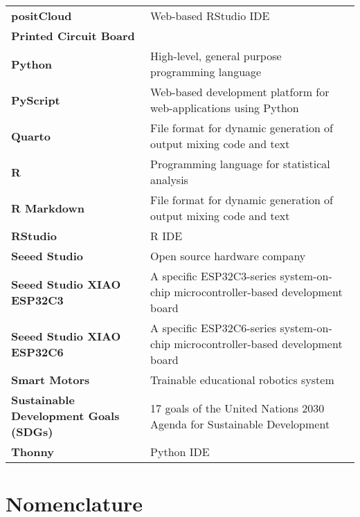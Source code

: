 {\begin{longtable}{>{\raggedright \bfseries}p{} p{}}
positCloud          & Web-based RStudio IDE \\
Printed Circuit Board&  \\
Python              & High-level, general purpose programming language \\
PyScript            & Web-based development platform for web-applications using Python \\
Quarto              & File format for dynamic generation of output mixing code and text \\
R                   & Programming language for statistical analysis \\
R Markdown          & File format for dynamic generation of output mixing code and text \\
RStudio             & R IDE\\
Seeed Studio        & Open source hardware company \\
Seeed Studio XIAO ESP32C3 & A specific ESP32C3-series system-on-chip microcontroller-based development board \\
Seeed Studio XIAO ESP32C6 & A specific ESP32C6-series system-on-chip microcontroller-based development board\\
Smart Motors        & Trainable educational robotics system \\
Sustainable Development Goals (SDGs) & 17 goals of the United Nations 2030 Agenda for Sustainable Development \\
Thonny              & Python IDE \\

\end{longtable}
}

\chapter*{Nomenclature}%
%
%
%

